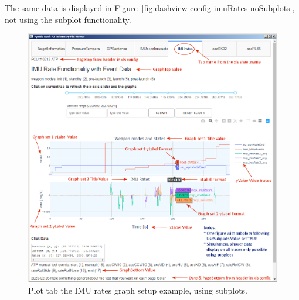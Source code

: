 The same data is displayed in Figure~\ref{fig:dashview-config-imuRates-noSubplots}, not using the subplot functionality.

\begin{figure}[h]
\centering
\includegraphics[width=\textwidth]{pic/dashview-imuRates}
\caption{Plot tab the IMU rates graph setup example, using subplots.
\label{fig:dashview-imuRates}}
\end{figure}


